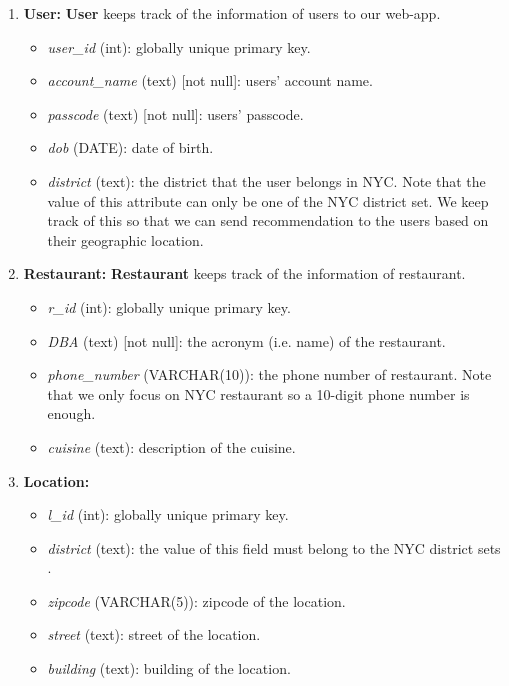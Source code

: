 \documentclass[a4paper,12pt]{article}
\theoremstyle{definition}
\begin{document}
\begin{enumerate}
    \item \textbf{User:} \textbf{User} keeps track of the information of users to our web-app. 
    \begin{itemize}
        \item \textit{user\_id} (int): globally unique primary key.
        \item \textit{account\_name} (text) [not null]: users' account name.
        \item \textit{passcode} (text) [not null]: users' passcode.
        \item \textit{dob} (DATE): date of birth.
        \item \textit{district} (text): the district that the user belongs in NYC. Note that the value of this attribute can only be one of the NYC district set\footnotemark[1]. We keep track of this so that we can send recommendation to the users based on their geographic location.
    \end{itemize}
    \item \textbf{Restaurant:} \textbf{Restaurant} keeps track of the information of restaurant.
    \begin{itemize}
        \item \textit{r\_id} (int): globally unique primary key.
        \item \textit{DBA} (text) [not null]: the acronym (i.e. name) of the restaurant.
        \item \textit{phone\_number} (VARCHAR(10)): the phone number of restaurant. Note that we only focus on NYC restaurant so a 10-digit phone number is enough.
        \item \textit{cuisine} (text): description of the cuisine.
    \end{itemize}
    \item \textbf{Location:} 
    \begin{itemize}
        \item \textit{l\_id} (int): globally unique primary key.
        \item \textit{district} (text): the value of this field must belong to the NYC district sets \footnotemark[1].
        \item \textit{zipcode} (VARCHAR(5)): zipcode of the location.
        \item \textit{street} (text): street of the location.
        \item \textit{building} (text): building of the location.
    \end{itemize}


\end{enumerate}
\end{document}
